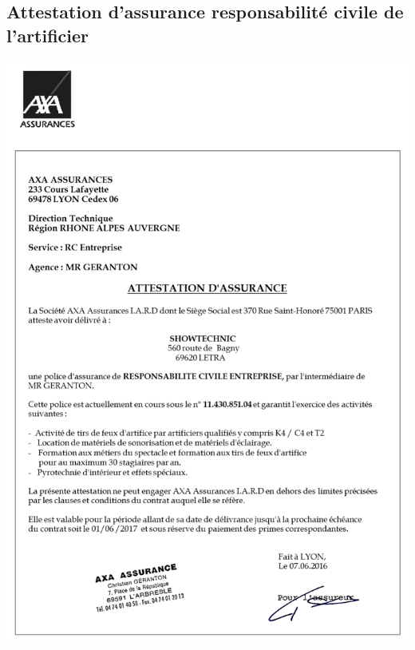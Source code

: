 \documentclass[hidelinks, paper=a4, fontsize=13pt]{report}
\begin{document}
\subsection{Attestation d’assurance responsabilité civile de l’artificier}
\begin{center}
	\includegraphics[scale=0.75,keepaspectratio]{Annexes/Documents/AttestationAssuranceShowtechnic}
\end{center}
\end{document}
